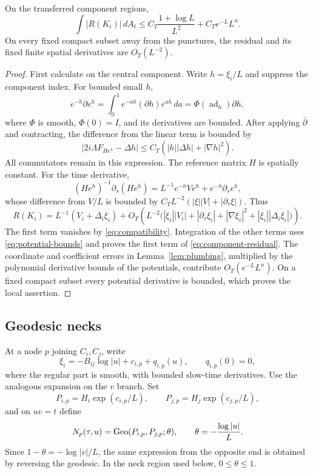 \begin{lemma}\label{lem:component-residual}
On the transferred component regions,
\begin{equation}\label{eq:component-residual}
 \int |R(K_i)|\,dA_t
 \le C_T\frac{1+\log L}{L^2}+C_Te^{-L}L^n.
\end{equation}
On every fixed compact subset away from the punctures, the residual
and its fixed finite spatial derivatives are $O_T(L^{-2})$.
\end{lemma}
\begin{proof}
First calculate on the central component. Write $h=\xi_i/L$ and
suppress the component index. For bounded small $h$,
\[
 e^{-h}\partial e^h
 =\int_0^1 e^{-ah}(\partial h)e^{ah}\,da
 =\Phi(\operatorname{ad}_h)\partial h,
\]
where $\Phi$ is smooth, $\Phi(0)=I$, and its derivatives are bounded.
After applying $\bar\partial$ and contracting, the difference from
the linear term is bounded by
\[
 |2i\Lambda F_{He^h}-\Delta h|
 \le C_T(|h||\Delta h|+|\nabla h|^2).
\]
All commutators remain in this expression. The reference matrix $H$
is spatially constant. For the time derivative,
\[
 (He^h)^{-1}\partial_s(He^h)
 =L^{-1}e^{-h}Ve^h+e^{-h}\partial_s e^h,
\]
whose difference from $V/L$ is bounded by
$C_TL^{-2}(|\xi||V|+|\partial_\tau\xi|)$. Thus
\begin{equation}\label{eq:thick-expansion}
 R(K_i)=L^{-1}(V_i+\Delta_i\xi_i)
 +O_T\!\left(L^{-2}\bigl(|\xi_i||V_i|+|\partial_\tau\xi_i|
             +|\nabla\xi_i|^2+|\xi_i||\Delta_i\xi_i|\bigr)\right).
\end{equation}
The first term vanishes by \eqref{eq:compatibility}. Integration of
the other terms uses \eqref{eq:potential-bounds} and proves the first
term of \eqref{eq:component-residual}. The coordinate and coefficient
errors in Lemma~\ref{lem:plumbing}, multiplied by the polynomial
derivative bounds of the potentials, contribute $O_T(e^{-L}L^n)$.
On a fixed compact subset every potential derivative is bounded,
which proves the local assertion.
\end{proof}

\subsection{Geodesic necks}
At a node $p$ joining $C_i,C_j$, write
\begin{equation}\label{eq:regular-parts}
 \xi_i=-B_{ij}\log|u|+c_{i,p}+q_{i,p}(u),\qquad q_{i,p}(0)=0,
\end{equation}
where the regular part is smooth, with bounded slow-time derivatives.
Use the analogous expansion on the $v$ branch. Set
\[
 P_{i,p}=H_i\exp(c_{i,p}/L),\qquad
 P_{j,p}=H_j\exp(c_{j,p}/L),
\]
and on $uv=t$ define
\begin{equation}\label{eq:neck-profile}
 N_p(\tau,u)=\operatorname{Geo}(P_{i,p},P_{j,p};\theta),
 \qquad \theta=-\frac{\log|u|}{L}.
\end{equation}
Since $1-\theta=-\log|v|/L$, the same expression from the opposite
end is obtained by reversing the geodesic. In the neck region used
below, $0\le\theta\le1$.

